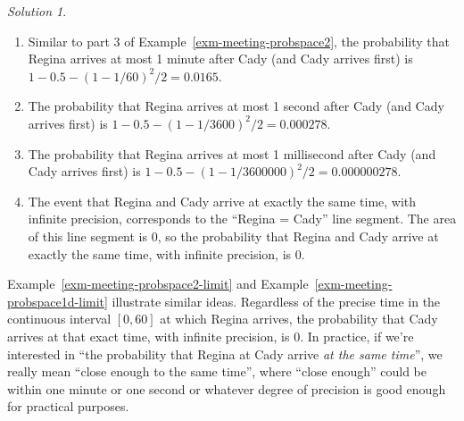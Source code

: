 \documentclass[
  letterpaper,
  DIV=11,
  numbers=noendperiod]{scrreprt}
\providecommand{\tightlist}{%
  \setlength{\itemsep}{0pt}\setlength{\parskip}{0pt}}
\theoremstyle{plain}
\theoremstyle{definition}
\theoremstyle{definition}
\theoremstyle{definition}
\theoremstyle{remark}
\newtheorem{refsolution}{Solution}[chapter]
\begin{document}
\begin{tcolorbox}[enhanced jigsaw, opacityback=0, rightrule=.15mm, coltitle=black, colframe=quarto-callout-tip-color-frame, toprule=.15mm, colbacktitle=quarto-callout-tip-color!10!white, opacitybacktitle=0.6, left=2mm, toptitle=1mm, breakable, title={Solution (click to expand)}, bottomtitle=1mm, colback=white, leftrule=.75mm, titlerule=0mm, arc=.35mm, bottomrule=.15mm]

\begin{refsolution}
\leavevmode

\begin{enumerate}
\def\labelenumi{\arabic{enumi}.}
\tightlist
\item
  Similar to part 3 of Example~\ref{exm-meeting-probspace2}, the
  probability that Regina arrives at most 1 minute after Cady (and Cady
  arrives first) is \(1 - 0.5 - (1-1/60)^2/2=0.0165\).
\item
  The probability that Regina arrives at most 1 second after Cady (and
  Cady arrives first) is \(1 - 0.5 - (1-1/3600)^2/2=0.000278\).
\item
  The probability that Regina arrives at most 1 millisecond after Cady
  (and Cady arrives first) is
  \(1 - 0.5 - (1-1/3600000)^2/2=0.000000278\).
\item
  The event that Regina and Cady arrive at exactly the same time, with
  infinite precision, corresponds to the ``Regina = Cady'' line segment.
  The area of this line segment is 0, so the probability that Regina and
  Cady arrive at exactly the same time, with infinite precision, is 0.
\end{enumerate}

\label{sol-meeting-probspace2-limit}

\end{refsolution}

\end{tcolorbox}

Example~\ref{exm-meeting-probspace2-limit} and
Example~\ref{exm-meeting-probspace1d-limit} illustrate similar ideas.
Regardless of the precise time in the continuous interval \([0, 60]\) at
which Regina arrives, the probability that Cady arrives at that exact
time, with infinite precision, is 0. In practice, if we're interested in
``the probability that Regina at Cady arrive \emph{at the same time}'',
we really mean ``close enough to the same time'', where ``close enough''
could be within one minute or one second or whatever degree of precision
is good enough for practical purposes.
\end{document}
